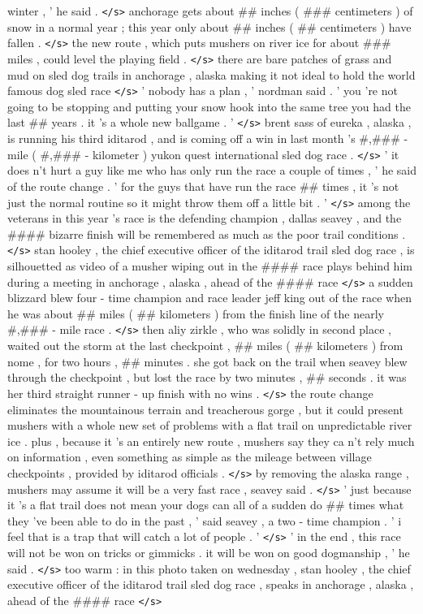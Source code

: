\documentclass[12pt]{report}
\begin{document}
\begin{appendices}
winter , ' he said . \texttt{</s>} anchorage gets about \#\# inches ( \#\#\# centimeters ) of snow in a normal year ; this year only about \#\# inches ( \#\# centimeters ) have fallen . \texttt{</s>} the new route , which puts mushers on river ice for about \#\#\# miles , could level the playing field . \texttt{</s>} there are bare patches of grass and mud on sled dog trails in anchorage , alaska making it not ideal to hold the world famous dog sled race \texttt{</s>} ' nobody has a plan , ' nordman said . ' you 're not going to be stopping and putting your snow hook into the same tree you had the last \#\# years . it 's a whole new ballgame . ' \texttt{</s>} brent sass of eureka , alaska , is running his third iditarod , and is coming off a win in last month 's \#,\#\#\# - mile ( \#,\#\#\# - kilometer ) yukon quest international sled dog race . \texttt{</s>} ' it does n't hurt a guy like me who has only run the race a couple of times , ' he said of the route change . ' for the guys that have run the race \#\# times , it 's not just the normal routine so it might throw them off a little bit . ' \texttt{</s>} among the veterans in this year 's race is the defending champion , dallas seavey , and the \#\#\#\# bizarre finish will be remembered as much as the poor trail conditions . \texttt{</s>} stan hooley , the chief executive officer of the iditarod trail sled dog race , is silhouetted as video of a musher wiping out in the \#\#\#\# race plays behind him during a meeting in anchorage , alaska , ahead of the \#\#\#\# race \texttt{</s>} a sudden blizzard blew four - time champion and race leader jeff king out of the race when he was about \#\# miles ( \#\# kilometers ) from the finish line of the nearly \#,\#\#\# - mile race . \texttt{</s>} then aliy zirkle , who was solidly in second place , waited out the storm at the last checkpoint , \#\# miles ( \#\# kilometers ) from nome , for two hours , \#\# minutes . she got back on the trail when seavey blew through the checkpoint , but lost the race by two minutes , \#\# seconds . it was her third straight runner - up finish with no wins . \texttt{</s>} the route change eliminates the mountainous terrain and treacherous gorge , but it could present mushers with a whole new set of problems with a flat trail on unpredictable river ice . plus , because it 's an entirely new route , mushers say they ca n't rely much on information , even something as simple as the mileage between village checkpoints , provided by iditarod officials . \texttt{</s>} by removing the alaska range , mushers may assume it will be a very fast race , seavey said . \texttt{</s>} ' just because it 's a flat trail does not mean your dogs can all of a sudden do \#\# times what they 've been able to do in the past , ' said seavey , a two - time champion . ' i feel that is a trap that will catch a lot of people . ' \texttt{</s>} ' in the end , this race will not be won on tricks or gimmicks . it will be won on good dogmanship , ' he said . \texttt{</s>} too warm : in this photo taken on wednesday , stan hooley , the chief executive officer of the iditarod trail sled dog race , speaks in anchorage , alaska , ahead of the \#\#\#\# race \texttt{</s>}


\end{appendices}
\end{document}
